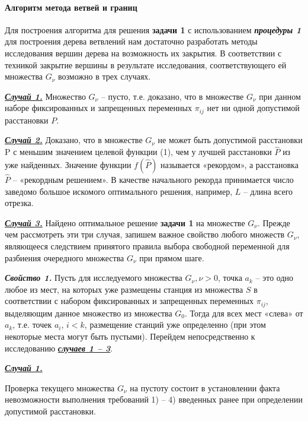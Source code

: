 \paragraph{Алгоритм метода ветвей и границ} \label{BnB}
Для построения алгоритма  для решения \textbf{задачи 1} с использованием \textit{\textbf{процедуры 1}} для построения дерева ветвлений нам достаточно разработать методы исследования вершин дерева на возможность их закрытия.
В соответствии с техникой  закрытие вершины в результате исследования, соответствующего ей множества $G_\nu$ возможно в трех случаях.

\underline{\textit{\textbf{Случай 1.}}} Множество $G_\nu$ -- пусто, т.е. доказано, что в множестве $G_\nu$ при данном наборе фиксированных и запрещенных переменных $\pi_{ij}$ нет ни одной допустимой расстановки $P$.

\underline{\textit{\textbf{Случай 2.}}} Доказано, что в множестве $G_\nu$ не может быть допустимой расстановки P с меньшим значением целевой функции (1), чем у лучшей расстановки $\widehat{P}$ из уже найденных. Значение функции $f(\widehat{P})$ называется «рекордом», а расстановка $\widehat{P}$ -- «рекордным решением». В качестве начального рекорда принимается число заведомо большое искомого оптимального решения, например, $L$ – длина всего отрезка.

\underline{\textit{\textbf{Случай 3.}}} Найдено оптимальное решение \textbf{задачи 1} на множестве $G_\nu$.
Прежде чем рассмотреть эти три случая, запишем важное свойство любого множеств $G_\nu$, являющееся следствием принятого правила выбора свободной переменной для разбиения очередного множества $G_\nu$ при прямом шаге. 

\textit{\textbf{Свойство 1.}} Пусть для исследуемого множества $G_\nu, \nu > 0$, точка $a_k$ -- это одно любое из мест, на которых уже размещены станция из множества $S$ в соответствии с набором фиксированных и запрещенных переменных $\pi_{ij}$, выделяющим данное множество из множества $G_0$. Тогда для всех мест «слева» от $a_k$, т.е. точек $a_i$, $i<k$, размещение станций уже определенно (при этом некоторые места могут быть пустыми).
Перейдем непосредственно к исследованию \underline{\textit{\textbf{случаев 1 – 3}}}.

\underline{\textit{\textbf{Случай 1.}}}

Проверка текущего множества $G_\nu$ на пустоту состоит в установлении факта невозможности выполнения требований 1) – 4) введенных ранее при определении допустимой расстановки.

